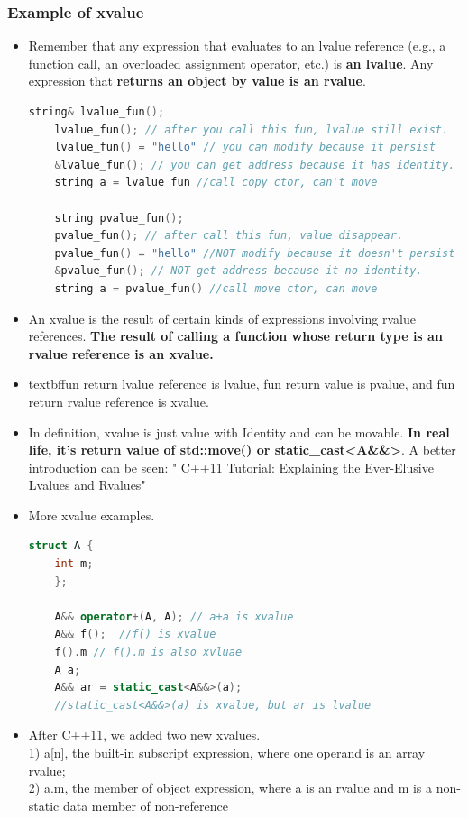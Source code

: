 \documentclass[a4paper,12pt,twoside]{book}
\begin{document}
\subsubsection{Example of xvalue}

\begin{itemize}
	\item Remember that any expression that evaluates to an lvalue reference (e.g., a function call, an overloaded assignment operator, etc.) is \textbf{an lvalue}. Any expression that \textbf{returns an object by value is an rvalue}.
	
	\begin{lstlisting}[frame=single, language=c++, mathescape=true]
	string& lvalue_fun();
	lvalue_fun(); // after you call this fun, lvalue still exist.
	lvalue_fun() = "hello" // you can modify because it persist
	&lvalue_fun(); // you can get address because it has identity.
	string a = lvalue_fun //call copy ctor, can't move
	
	string pvalue_fun();
	pvalue_fun(); // after call this fun, value disappear.
	pvalue_fun() = "hello" //NOT modify because it doesn't persist
	&pvalue_fun(); // NOT get address because it no identity.
	string a = pvalue_fun() //call move ctor, can move
	\end{lstlisting}
	
	\item An xvalue is the result of certain kinds of expressions involving rvalue references. \textbf{The result of calling a function whose return type is an rvalue reference is an xvalue.}
	
	\item textbf{fun return lvalue reference is lvalue, fun return value is pvalue, and fun return rvalue reference is xvalue.}
	
	\item In definition,  xvalue is just value with Identity and can be movable. \textbf{In real life, it's  return value of std::move() or static\_cast<A\&\&>}. A better introduction can be seen: " C++11 Tutorial: Explaining the Ever-Elusive Lvalues and Rvalues"
	
	\item More xvalue examples.
	\begin{lstlisting}[frame=single, language=c++, mathescape=true]
	struct A {
	int m;
	};
	
	A&& operator+(A, A); // a+a is xvalue
	A&& f();  //f() is xvalue
	f().m // f().m is also xvluae
	A a;
	A&& ar = static_cast<A&&>(a);
	//static_cast<A&&>(a) is xvalue, but ar is lvalue
	\end{lstlisting}
	
	\item After C++11, we added two new xvalues.\\
	1) a[n], the built-in subscript expression, where one operand is an array rvalue;\\
	2) a.m, the member of object expression, where a is an rvalue and m is a non-static data member of non-reference
\end{itemize}
\end{document}
